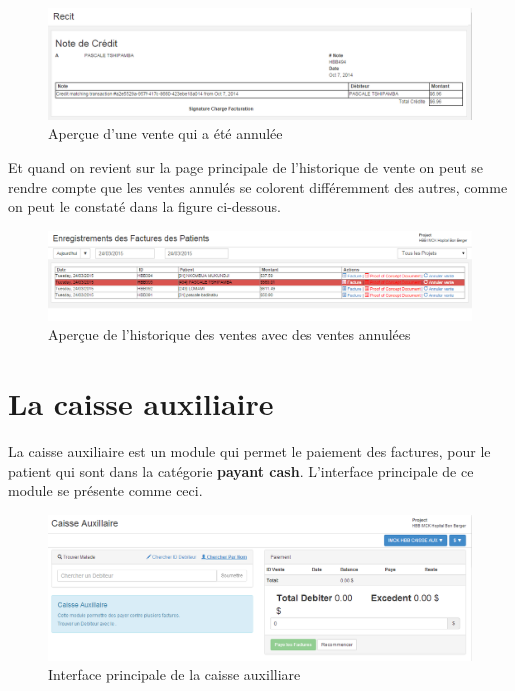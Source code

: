 \documentclass[12pt,a4paper]{report}
\begin{document}
\begin{figure}[h]
\begin{center}
\includegraphics[width=14cm]{pic/RecetteCredit.png}
\end{center}
\caption{Aperçue d'une vente qui a été annulée}
\label{Aperçue d'une vente qui a été annulée}
\end{figure}

Et quand on revient sur la page principale de l'historique de vente on peut se rendre compte que les ventes annulés se colorent différemment des autres, comme on peut le constaté dans la figure ci-dessous.

\begin{figure}[h]
\begin{center}
\includegraphics[width=14cm]{pic/HistoriqueVenteDell.png}
\end{center}
\caption{Aperçue de l'historique des ventes avec des ventes annulées}
\label{Aperçue de l'historique des ventes avec des ventes annulées}
\end{figure}

\section{La caisse auxiliaire}
La caisse auxiliaire est un module qui permet le paiement des factures, pour le patient qui sont dans la catégorie \textbf{payant cash}. L'interface principale de ce module se présente comme ceci.


\begin{figure}[h]
\begin{center}
\includegraphics[width=14cm]{pic/CaisseAuxillaire.png}
\end{center}
\caption{Interface principale de la caisse auxilliare}
\label{Interface principale de la caisse auxilliare}
\end{figure}
\end{document}
